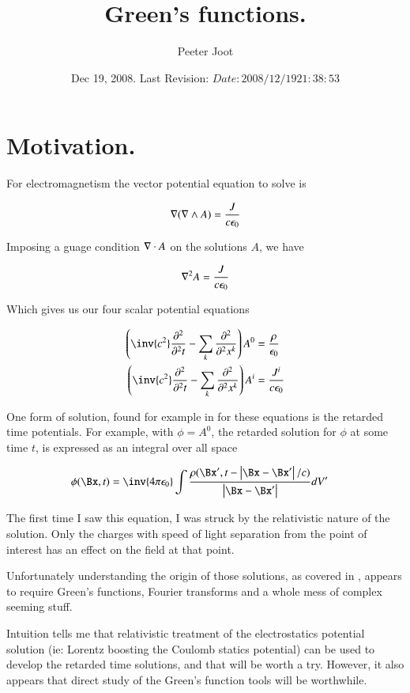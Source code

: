 \documentclass{article}
\title{ Green's functions. }
\author{Peeter Joot}
\date{ Dec 19, 2008.  Last Revision: $Date: 2008/12/19 21:38:53 $ }
\begin{document}
\maketitle{}

\section{ Motivation. }

For electromagnetism the vector potential equation to solve is

\begin{align*}
\nabla (\nabla \wedge A) = \frac{J}{c \epsilon_0}
\end{align*}

Imposing a guage condition $\nabla \cdot A$ on the solutions $A$, we have

\begin{align*}
\nabla^2 A = \frac{J}{c \epsilon_0}
\end{align*}

Which gives us our four scalar potential equations

\begin{align*}
\left(\inv{c^2}\PDsq{t}{} - \sum_k \PDsq{x^k}{} \right) A^0 &= \frac{\rho}{\epsilon_0} \\
\left(\inv{c^2}\PDsq{t}{} - \sum_k \PDsq{x^k}{} \right) A^i &= \frac{J^i}{c \epsilon_0} \\
\end{align*}

One form of solution, found for example in \cite{feynman1963flp}
for these equations is the retarded time potentials.  For example, with $\phi = A^0$, the retarded solution for $\phi$ at some time $t$, is expressed as an integral over all space

\begin{align*}
\phi(\Bx, t) &= \inv{4 \pi \epsilon_0} \int \frac{\rho(\Bx', t - \Abs{\Bx-\Bx'}/c)}{\Abs{\Bx - \Bx'}} dV'
\end{align*}

The first time I saw this equation, I was struck by the relativistic nature of the solution.  Only the charges with speed of light separation from the point of interest has an effect on the field at that point.

Unfortunately understanding the origin of those solutions, as covered in
\cite{ FitzRelEandM }, 
appears to require Green's functions, Fourier transforms and a whole mess
of complex seeming stuff.

Intuition tells me that relativistic treatment
of the electrostatics potential solution (ie: Lorentz boosting the Coulomb
statics potential) 
can be used to develop the 
retarded time solutions, and that will be worth a try.  However, it also
appears that direct study of the Green's
function tools will be worthwhile.
\end{document}
